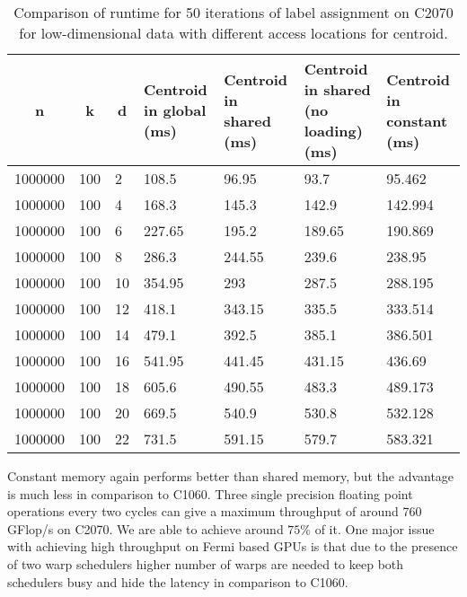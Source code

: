 \begin{table}[htbp]
\begin{center}
\begin{tabular}{|p{1.6cm}|p{0.8cm}|p{0.5cm}|p{2.2cm}|p{2.2cm}|p{2.2cm}|p{2.2cm}|}
\hline
\multicolumn{1}{|c|}{n} & \multicolumn{1}{c|}{k} & \multicolumn{1}{c|}{d} & \multicolumn{1}{p{2.2cm}|}{Centroid in global (ms)} & \multicolumn{1}{p{2.2cm}|}{Centroid in shared (ms)} & \multicolumn{1}{p{2.2cm}|}{Centroid in shared (no loading) (ms)} & \multicolumn{1}{p{2.2cm}|}{Centroid in constant (ms)} \\ \hline
1000000 & 100 & 2 & 108.5 & 96.95 & 93.7 & 95.462 \\ \hline
1000000 & 100 & 4 & 168.3 & 145.3 & 142.9 & 142.994 \\ \hline
1000000 & 100 & 6 & 227.65 & 195.2 & 189.65 & 190.869 \\ \hline
1000000 & 100 & 8 & 286.3 & 244.55 & 239.6 & 238.95 \\ \hline
1000000 & 100 & 10 & 354.95 & 293 & 287.5 & 288.195 \\ \hline
1000000 & 100 & 12 & 418.1 & 343.15 & 335.5 & 333.514 \\ \hline
1000000 & 100 & 14 & 479.1 & 392.5 & 385.1 & 386.501 \\ \hline
1000000 & 100 & 16 & 541.95 & 441.45 & 431.15 & 436.69 \\ \hline
1000000 & 100 & 18 & 605.6 & 490.55 & 483.3 & 489.173 \\ \hline
1000000 & 100 & 20 & 669.5 & 540.9 & 530.8 & 532.128 \\ \hline
1000000 & 100 & 22 & 731.5 & 591.15 & 579.7 & 583.321 \\ \hline
\end{tabular}
\end{center}
\caption{Comparison of runtime for 50 iterations of label assignment on C2070 for low-dimensional data with different access locations for centroid.}
\label{table:lowC2070}
\end{table}

Constant memory again performs better than shared memory, but the advantage is much less in comparison to C1060. Three single precision floating point operations every two cycles can give a maximum throughput of around 760 GFlop/s on C2070. We are able to achieve around $75\%$ of it. One major issue with achieving high throughput on Fermi based GPUs is that due to the presence of two warp schedulers higher number of warps are needed to keep both schedulers busy and hide the latency in comparison to C1060.


